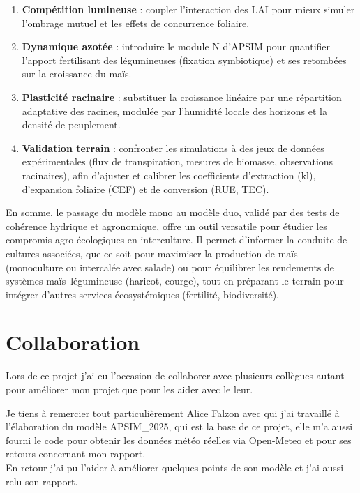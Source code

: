 \documentclass[
]{article}
\begin{document}
\begin{enumerate}
  \begin{enumerate}
  \def\labelenumii{\arabic{enumii}.}
  \item
    \textbf{Compétition lumineuse} : coupler l'interaction des LAI pour
    mieux simuler l'ombrage mutuel et les effets de concurrence
    foliaire.
  \item
    \textbf{Dynamique azotée} : introduire le module N d'APSIM pour
    quantifier l'apport fertilisant des légumineuses (fixation
    symbiotique) et ses retombées sur la croissance du maïs.
  \item
    \textbf{Plasticité racinaire} : substituer la croissance linéaire
    par une répartition adaptative des racines, modulée par l'humidité
    locale des horizons et la densité de peuplement.
  \item
    \textbf{Validation terrain} : confronter les simulations à des jeux
    de données expérimentales (flux de transpiration, mesures de
    biomasse, observations racinaires), afin d'ajuster et calibrer les
    coefficients d'extraction (kl), d'expansion foliaire (CEF) et de
    conversion (RUE, TEC).
  \end{enumerate}
\end{enumerate}

En somme, le passage du modèle mono au modèle duo, validé par des tests
de cohérence hydrique et agronomique, offre un outil versatile pour
étudier les compromis agro‐écologiques en interculture. Il permet
d'informer la conduite de cultures associées, que ce soit pour maximiser
la production de maïs (monoculture ou intercalée avec salade) ou pour
équilibrer les rendements de systèmes maïs--légumineuse (haricot,
courge), tout en préparant le terrain pour intégrer d'autres services
écosystémiques (fertilité, biodiversité).

\newpage

\section{Collaboration}\label{collaboration}

Lors de ce projet j'ai eu l'occasion de collaborer avec plusieurs
collègues autant pour améliorer mon projet que pour les aider avec le
leur.

Je tiens à remercier tout particulièrement Alice Falzon avec qui j'ai
travaillé à l'élaboration du modèle APSIM\_2025, qui est la base de ce
projet, elle m'a aussi fourni le code pour obtenir les données météo
réelles via Open-Meteo et pour ses retours concernant mon rapport.\\
En retour j'ai pu l'aider à améliorer quelques points de son modèle et
j'ai aussi relu son rapport.
\end{document}
